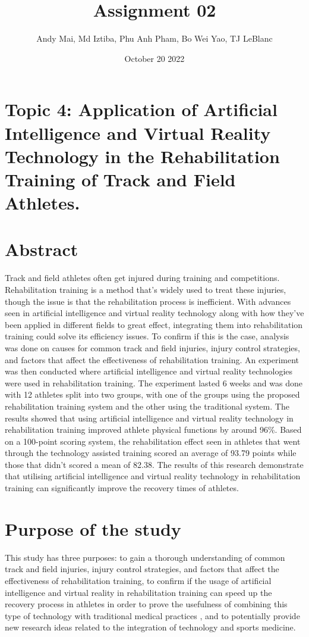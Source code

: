 \documentclass{article}
\title{Assignment 02}
\author{Andy Mai, Md Iztiba, Phu Anh Pham, Bo Wei Yao, TJ LeBlanc}
\date{October 20 2022}
\begin{document}
\maketitle

\section*{Topic 4: Application of Artificial Intelligence and Virtual Reality Technology in the Rehabilitation Training of Track and Field Athletes.}

\section*{Abstract}
Track and field athletes often get injured during training and competitions. Rehabilitation training is a method that’s widely used to treat these injuries, though the issue is that the rehabilitation process is inefficient. With advances seen in artificial intelligence and virtual reality technology along with how they’ve been applied in different fields to great effect, integrating them into rehabilitation training could solve its efficiency issues. To confirm if this is the case, analysis was done on causes for common track and field injuries, injury control strategies, and factors that affect the effectiveness of rehabilitation training. An experiment was then conducted where artificial intelligence and virtual reality technologies were used in rehabilitation training. The experiment lasted 6 weeks and was done with 12 athletes split into two groups, with one of the groups using the proposed rehabilitation training system and the other using the traditional system. The results showed that using artificial intelligence and virtual reality technology in rehabilitation training improved athlete physical functions by around 96\%. Based on a 100-point scoring system, the rehabilitation effect seen in athletes that went through the technology assisted training scored an average of 93.79 points while those that didn’t scored a mean of 82.38. The results of this research demonstrate that utilising artificial intelligence and virtual reality technology in rehabilitation training can significantly improve the recovery times of athletes.
\section*{Purpose of the study}
This study has three purposes: to gain a thorough understanding of common track and field injuries, injury control strategies, and factors that affect the effectiveness of rehabilitation training, to confirm if the usage of artificial intelligence and virtual reality in rehabilitation training can speed up the recovery process in athletes in order to prove the usefulness of combining this type of technology with traditional medical practices \cite{Lai2018}, and to potentially provide new research ideas related to the integration of technology and sports medicine.
\end{document}
